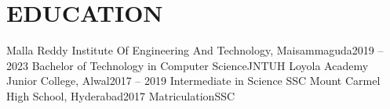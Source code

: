 \section{EDUCATION}
    \resumeSubHeadingListStart

    \resumeSubheading
    {Malla Reddy Institute Of Engineering And Technology, Maisammaguda}{2019 -- 2023}
    {Bachelor of Technology in Computer Science}{JNTUH}
    \resumeSubheading
    {Loyola Academy Junior College, Alwal}{2017 -- 2019}
    {Intermediate in Science }{SSC}
    \resumeSubheading
    {Mount Carmel High School, Hyderabad}{2017}
    {Matriculation}{SSC}
    \resumeSubHeadingListEnd